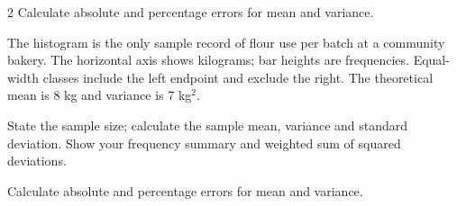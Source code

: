 \begin{multicols}{2}
Calculate absolute and percentage errors for mean and variance. 


The histogram is the only sample record of flour use per batch at a community bakery. The horizontal axis shows kilograms; bar heights are frequencies. Equal-width classes include the left endpoint and exclude the right. The theoretical mean is 8 kg and variance is 7 kg$^2$.

State the sample size; calculate the sample mean, variance and standard deviation. Show your frequency summary and weighted sum of squared deviations. 

Calculate absolute and percentage errors for mean and variance. 


\end{multicols}

